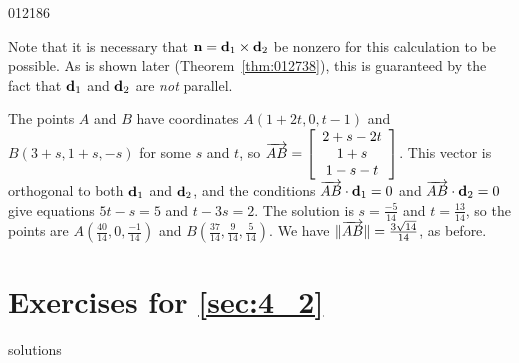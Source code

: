 \begin{example}{}{012186}
\begin{solution}
Note that it is necessary that $\textbf{n} = \textbf{d}_{1} \times \textbf{d}_{2}$ be nonzero for this calculation to be possible. As is shown later (Theorem~\ref{thm:012738}), this is guaranteed by the fact that $\textbf{d}_{1}$ and $\textbf{d}_{2}$ are \textit{not} parallel.


The points $A$ and $B$ have coordinates $A(1 + 2t, 0, t - 1)$ and $B(3 + s, 1 + s, -s)$ for some $s$ and $t$, so $\overrightarrow{AB} = \left[
\begin{array}{c}
2 + s - 2t\\
1 + s\\
1 - s - t
\end{array}
\right]$. This vector is orthogonal to both $\textbf{d}_{1}$ and $\textbf{d}_{2}$, and the conditions $\overrightarrow{AB} \cdot \textbf{d}_{1} = 0$ and $\overrightarrow{AB} \cdot \textbf{d}_{2} = 0$ give equations $5t - s = 5$ and $t -3s = 2$. The solution is $s = \frac{-5}{14}$
 and $t = \frac{13}{14}$, so the points are $A(\frac{40}{14}, 0, \frac{-1}{14})$ and $B(\frac{37}{14}, \frac{9}{14}, \frac{5}{14})$. We have $\| \overrightarrow{AB} \| = \tfrac{3\sqrt{14}}{14}$, as before.
\end{solution}
\end{example}


\section*{Exercises for \ref{sec:4_2}}

\begin{Filesave}{solutions}
\end{Filesave}

